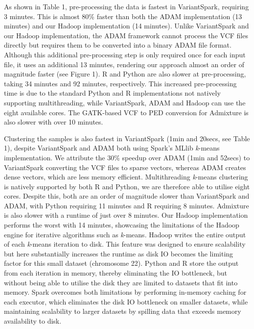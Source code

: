 \documentclass{bmcart}
\newcommand{\variantSpark}{{\sc VariantSpark}}
\newcommand{\kMeans}{\textit{k}-means}
\begin{document}
As shown in Table 1, pre-processing the data is fastest in \variantSpark{}, requiring 3 minutes. %
This is almost 80\% faster than both the {\sc ADAM} implementation (13 minutes) %
and our Hadoop implementation (14 minutes). %
Unlike \variantSpark{} and our Hadoop implementation, the {\sc ADAM} framework cannot process the VCF files directly but requires them to be converted into a binary {\sc ADAM} file format. 
Although this additional pre-processing step is only required once for each input file, it uses an additional 13 minutes, %
rendering our approach almost an order of magnitude faster (see Figure 1).
R and Python are also slower at pre-processing, taking 34 minutes and 92 minutes, respectively. %
This increased pre-processing time is due to the standard Python and R implementations not natively supporting multithreading, while \variantSpark{}, {\sc ADAM} and Hadoop can use the eight available cores.
The GATK-based VCF to PED conversion for {\sc Admixture} is also slower with over 10 minutes. 

Clustering the samples is also fastest in \variantSpark{} (1min and 20secs, see Table 1), despite \variantSpark{} and {\sc ADAM} both using {\sc Spark}'s MLlib \kMeans{} implementation. %
We attribute the 30\% speedup over {\sc ADAM} (1min and 52secs) to \variantSpark{} converting the VCF files to sparse vectors, whereas {\sc ADAM} creates dense vectors, which are less memory efficient. %
Multithreading \kMeans{} clustering is natively supported by both R and Python, we are therefore able to utilise eight cores. 
Despite this, both are an order of magnitude slower than \variantSpark{} and {\sc ADAM}, with Python requiring 11 minutes  and R requiring 8 minutes. %
{\sc Admixture} is also slower with a runtime of just over 8 minutes. 
Our Hadoop implementation performs the worst with 14 minutes, showcasing the limitations of the Hadoop engine for iterative algorithms such as \kMeans{}. %
Hadoop writes the entire output of each \kMeans{} iteration to disk. This feature was designed to ensure scalability but here substantially increases the runtime as disk IO becomes the limiting factor for this small dataset (chromosome 22).
Python and R store the output from each iteration in memory, thereby eliminating the IO bottleneck, but without being able to utilise the disk they are limited to datasets that fit into memory.
{\sc Spark} overcomes both limitations by performing in-memory caching for each executor, which eliminates the disk IO bottleneck on smaller datasets, while maintaining scalability to larger datasets by spilling data that exceeds memory availability to disk.
\end{document}
